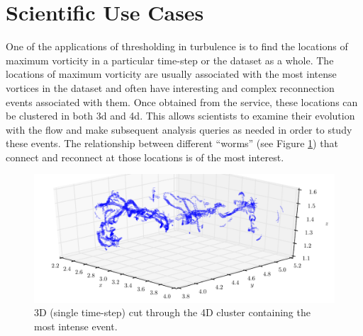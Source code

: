 \documentclass{sig-alternate}
\begin{document}
\section{Scientific Use Cases}\label{science_use_cases}

One of the applications of thresholding in turbulence is to find the locations of maximum vorticity in a particular time-step or the dataset as a whole.
The locations of maximum vorticity are usually associated with the most intense vortices in the dataset and often have interesting and complex
reconnection events associated with them. 
Once obtained from the service, these locations can be clustered in both 3d and 4d. This allows scientists to examine their evolution with the flow
and make subsequent analysis queries as needed in order to study these events. The relationship between different ``worms'' (see Figure \ref{fig:max_vort_cluster}) that connect and reconnect
at those locations is of the most interest.

\begin{figure}[t]
\centering
\includegraphics[width=7in]{Figures/most_intense_cluster_alt.pdf}
\caption{3D (single time-step) cut through the 4D cluster containing the most intense event.}
\label{fig:max_vort_cluster}
\end{figure}
\end{document}
